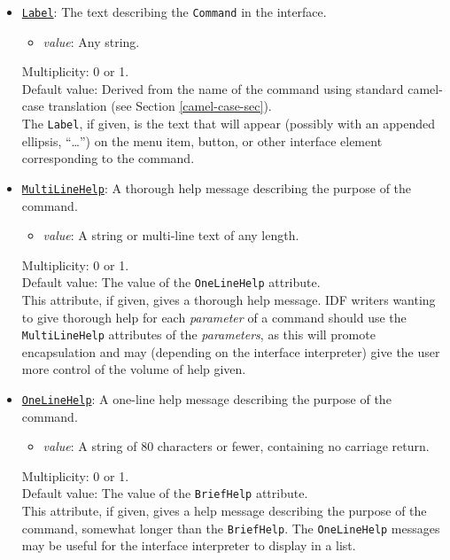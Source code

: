 \documentclass[11pt]{article}
\begin{document}
\begin{itemize}
\item \underline{\tt Label}:  The text describing the {\tt Command}
in the interface.
\begin{itemize}
\item {\it value}: Any string.
\end{itemize}
Multiplicity: 0 or 1. \\
Default value:  Derived from the name of the command using standard
camel-case translation (see Section \ref{camel-case-sec}). \\
The {\tt Label}, if given, is the text that will appear (possibly
with an appended ellipsis, ``\ldots'') on the menu item, button,
or other interface element corresponding to the command.

\item \underline{\tt MultiLineHelp}:  A thorough help message
describing the purpose of the command.
\begin{itemize}
\item {\it value}: A string or multi-line text of any length.
\end{itemize}
Multiplicity: 0 or 1. \\
Default value:  The value of the {\tt OneLineHelp} attribute. \\
This attribute, if given, gives a thorough help message.
IDF writers wanting to give thorough help for each {\it parameter}
of a command should use the {\tt MultiLineHelp} attributes of the
{\it parameters}, as this will promote encapsulation and may
(depending on the interface interpreter) give the user more
control of the volume of help given.

\item \underline{\tt OneLineHelp}:  A one-line help message
describing the purpose of the command.
\begin{itemize}
\item {\it value}: A string of 80 characters or fewer, containing
  no carriage return.
\end{itemize}
Multiplicity: 0 or 1. \\
Default value:  The value of the {\tt BriefHelp} attribute. \\
This attribute, if given, gives a help message describing the purpose of
the command, somewhat longer than the {\tt BriefHelp}.  The
{\tt OneLineHelp} messages may be useful for the interface interpreter to
display in a list.


\end{itemize}
\end{document}
